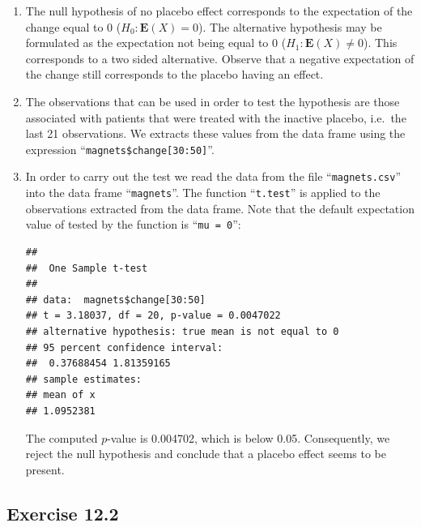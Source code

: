 \documentclass[]{krantz}
\makeatletter
\newenvironment{Shaded}{\begin{snugshade}}{\end{snugshade}}
\newcommand{\DecValTok}[1]{\textcolor[rgb]{0.00,0.00,0.81}{#1}}
\newcommand{\KeywordTok}[1]{\textcolor[rgb]{0.13,0.29,0.53}{\textbf{#1}}}
\newcommand{\NormalTok}[1]{#1}
\newcommand{\OperatorTok}[1]{\textcolor[rgb]{0.81,0.36,0.00}{\textbf{#1}}}
\newcommand{\StringTok}[1]{\textcolor[rgb]{0.31,0.60,0.02}{#1}}
\newcommand{\Expec}{\mathbf{E}}
\newenvironment{kframe}{%
\medskip{}
\setlength{\fboxsep}{.8em}
 \def\at@end@of@kframe{}%
 \ifinner\ifhmode%
  \def\at@end@of@kframe{\end{minipage}}%
  \begin{minipage}{\columnwidth}%
 \fi\fi%
 \def\FrameCommand##1{\hskip\@totalleftmargin \hskip-\fboxsep
 \colorbox{shadecolor}{##1}\hskip-\fboxsep
     \hskip-\linewidth \hskip-\@totalleftmargin \hskip\columnwidth}%
 \MakeFramed {\advance\hsize-\width
   \@totalleftmargin\z@ \linewidth\hsize
   \@setminipage}}%
 {\par\unskip\endMakeFramed%
 \at@end@of@kframe}
\renewenvironment{Shaded}{\begin{kframe}}{\end{kframe}}
\theoremstyle{definition}
\theoremstyle{definition}
\theoremstyle{definition}
\theoremstyle{remark}
\makeatother
\begin{document}
\begin{enumerate}
\def\labelenumi{\arabic{enumi}.}
\item
  The null hypothesis of no placebo
  effect corresponds to the expectation of the change equal to 0
  (\(H_0: \Expec(X) = 0\)). The alternative hypothesis may be formulated as
  the expectation not being equal to 0 (\(H_1: \Expec(X) \not = 0\)). This
  corresponds to a two sided alternative. Observe that a negative
  expectation of the change still corresponds to the placebo having an
  effect.
\item
  The observations that can be used in
  order to test the hypothesis are those associated with patients that
  were treated with the inactive placebo, i.e.~the last 21 observations.
  We extracts these values from the data frame using the expression
  ``\texttt{magnets\$change{[}30:50{]}}''.
\item
  In order to carry out the test we
  read the data from the file ``\texttt{magnets.csv}'' into the data frame
  ``\texttt{magnets}''. The function ``\texttt{t.test}'' is applied to the observations
  extracted from the data frame. Note that the default expectation value
  of tested by the function is ``\texttt{mu\ =\ 0}'':

\begin{Shaded}
\end{Shaded}

\begin{verbatim}
## 
##  One Sample t-test
## 
## data:  magnets$change[30:50]
## t = 3.18037, df = 20, p-value = 0.0047022
## alternative hypothesis: true mean is not equal to 0
## 95 percent confidence interval:
##  0.37688454 1.81359165
## sample estimates:
## mean of x 
## 1.0952381
\end{verbatim}

  The computed \(p\)-value is 0.004702, which is below 0.05. Consequently,
  we reject the null hypothesis and conclude that a placebo effect seems
  to be present.
\end{enumerate}

\hypertarget{exercise-12.2}{%
\subsection*{Exercise 12.2}\label{exercise-12.2}}
\end{document}
